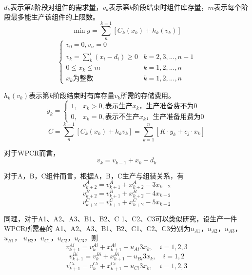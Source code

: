$d_k$表示第$k$阶段对组件的需求量，$v_k$表示第$k$阶段结束时组件库存量，$m$表示每个阶段最多能生产该组件的上限数。
\begin{equation}
    \min g = \sum_{n}^{k=1}[C_k(x_k)+h_k(v_k)]
\end{equation}
\begin{equation}
    \begin{cases}
        v_0=0,v_n=0 \\
        v_k=\sum_{k}^{i}(x_i - d_i) \ge 0 & k=2,3,...,n-1 \\
        0 \leq x_k \leq m & k=1,2,...,n \\
        x_k \text{为整数} & k=1,2,...,n
    \end{cases}
\end{equation}

$h_k(v_k)$表示第$k$阶段结束时有库存量$v_k$所需的存储费用。
\begin{equation}
    y_k=\begin{cases}
        1, & x_k > 0, \text{表示生产}x_k，\text{生产准备费不为}0 \\
        0, & x_k = 0, \text{表示不生产}x_k，\text{生产准备用费为}0 
    \end{cases}
\end{equation}
\begin{equation}
    C=\sum_{n}^{k=1}[C_k(x_k)+h_k{v_k}]=\sum_{k=1}^{n}[K \cdot y_k + c_j \cdot x_k]
\end{equation}

对于WPCR而言，
\begin{equation}
    v_k=v_{k-1} + x_k - d_k    
\end{equation}

对于A，B，C组件而言，根据A，B，C生产与组装关系，有
\begin{equation}
    v_{k+2}^A=v_{k+1}^A + x_{k+2}^A - 3x_{k+2}
\end{equation}
\begin{equation}
    v_{k+2}^B=v_{k+1}^B + x_{k+2}^B - 4x_{k+2}
\end{equation}
\begin{equation}
    v_{k+2}^C=v_{k+1}^C + x_{k+2}^C - 5x_{k+2}
\end{equation}

同理，对于A1、A2、A3、B1、B2、C 1、C2、C3可以类似研究，设生产一件WPCR所需要的
A1、A2、A3、B1、B2、C1、C2、C3分别为$u_{A1}$，$u_{A2}$，$u_{A3}$，$u_{B1}$，
$u_{B2}$，$u_{C1}$，$u_{C2}$，$u_{C3}$，则
\begin{equation}
    v_{k+1}^{Ai}=v_k^{Ai} + x_{k+1}^{Ai} - u_{Ai}3x_k,\quad i=1,2,3
\end{equation}
\begin{equation}
    v_{k+1}^{Bi}=v_k^{Bi} + x_{k+1}^{Bi} - u_{Bi}3x_k,\quad i=1,2
\end{equation}
\begin{equation}
    v_{k+1}^{Ci}=v_k^{Ci} + x_{k+1}^{Ci} - u_{Ci}3x_k,\quad i=1,2,3
\end{equation}

